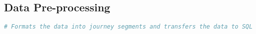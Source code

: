 \subsection{Data Pre-processing} %

\label{appendix:pre-processing} %



\begin{lstlisting}[language=Python]
# Formats the data into journey segments and transfers the data to SQL database.

\end{lstlisting}